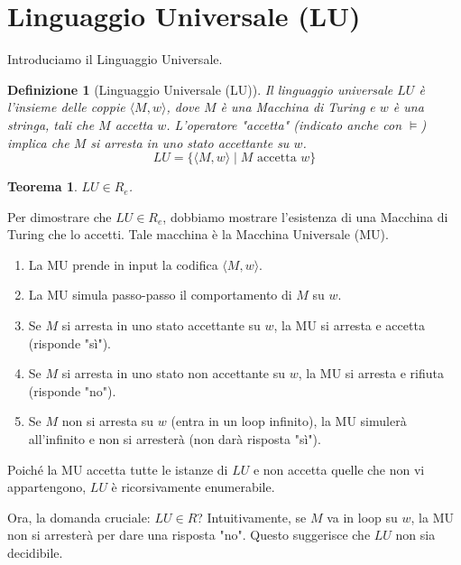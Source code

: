 \documentclass[a4paper]{article}
\makeatletter
\newtheorem{theorem}{Teorema}[section] %
\newtheorem{definition}{Definizione}[section] %
\renewenvironment{proof}[1][\proofname]{\par
  \pushQED{\qed}%
  \normalfont \topsep6\p@\@plus6\p@\relax
  \trivlist
  \item[\hskip\labelsep
        \bfseries
    #1\@addpunct{.}]\ignorespaces
}{%
  \popQED\endtrivlist\@endpefalse
}
\makeatother
\begin{document}
\section{Linguaggio Universale (LU)}

Introduciamo il Linguaggio Universale.
\begin{definition}[Linguaggio Universale (LU)]
Il linguaggio universale $LU$ è l'insieme delle coppie $\langle M, w \rangle$, dove $M$ è una Macchina di Turing e $w$ è una stringa, tali che $M$ accetta $w$. L'operatore "accetta" (indicato anche con $\models$) implica che $M$ si arresta in uno stato accettante su $w$.
\[ LU = \{ \langle M, w \rangle \mid M \text{ accetta } w \} \]
\end{definition}

\begin{theorem}
$LU \in R_e$.
\end{theorem}
\begin{proof}
Per dimostrare che $LU \in R_e$, dobbiamo mostrare l'esistenza di una Macchina di Turing che lo accetti. Tale macchina è la Macchina Universale (MU).
\begin{enumerate}
    \item La MU prende in input la codifica $\langle M, w \rangle$.
    \item La MU simula passo-passo il comportamento di $M$ su $w$.
    \item Se $M$ si arresta in uno stato accettante su $w$, la MU si arresta e accetta (risponde "sì").
    \item Se $M$ si arresta in uno stato non accettante su $w$, la MU si arresta e rifiuta (risponde "no").
    \item Se $M$ non si arresta su $w$ (entra in un loop infinito), la MU simulerà all'infinito e non si arresterà (non darà risposta "sì").
\end{enumerate}
Poiché la MU accetta tutte le istanze di $LU$ e non accetta quelle che non vi appartengono, $LU$ è ricorsivamente enumerabile.
\end{proof}

Ora, la domanda cruciale: $LU \in R$? Intuitivamente, se $M$ va in loop su $w$, la MU non si arresterà per dare una risposta "no". Questo suggerisce che $LU$ non sia decidibile.
\end{document}
